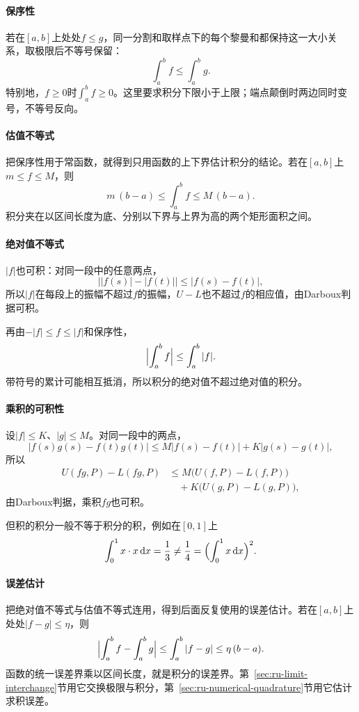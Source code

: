 \paragraph{保序性}
若在$[a,b]$上处处$f\leq g$，同一分割和取样点下的每个黎曼和都保持这一大小关系，取极限后不等号保留：
\[
 \int_a^bf\leq\int_a^bg.
\]
特别地，$f\geq0$时$\int_a^bf\geq0$。这里要求积分下限小于上限；端点颠倒时两边同时变号，不等号反向。

\paragraph{估值不等式}
把保序性用于常函数，就得到只用函数的上下界估计积分的结论。若在$[a,b]$上$m\leq f\leq M$，则
\[
 m\,(b-a)\leq\int_a^bf\leq M\,(b-a).
\]
积分夹在以区间长度为底、分别以下界与上界为高的两个矩形面积之间。

\paragraph{绝对值不等式}
$|f|$也可积：对同一段中的任意两点，
\[
 \bigl||f(s)|-|f(t)|\bigr|\leq|f(s)-f(t)|,
\]
所以$|f|$在每段上的振幅不超过$f$的振幅，$U-L$也不超过$f$的相应值，由Darboux判据可积。

再由$-|f|\leq f\leq|f|$和保序性，
\[
 \Bigl|\int_a^bf\Bigr|\leq\int_a^b|f|.
\]
带符号的累计可能相互抵消，所以积分的绝对值不超过绝对值的积分。

\paragraph{乘积的可积性}
设$|f|\leq K$、$|g|\leq M$。对同一段中的两点，
\[
 |f(s)g(s)-f(t)g(t)|\leq M|f(s)-f(t)|+K|g(s)-g(t)|,
\]
所以
\[
 \begin{aligned}
 U(fg,P)-L(fg,P)&\leq M\bigl(U(f,P)-L(f,P)\bigr)\\
 &\quad+K\bigl(U(g,P)-L(g,P)\bigr),
 \end{aligned}
\]
由Darboux判据，乘积$fg$也可积。

但积的积分一般不等于积分的积，例如在$[0,1]$上
\[
 \int_0^1x\cdot x\,\mathrm dx=\frac13\neq\frac14=\Bigl(\int_0^1x\,\mathrm dx\Bigr)^2.
\]

\paragraph{误差估计}
把绝对值不等式与估值不等式连用，得到后面反复使用的误差估计。若在$[a,b]$上处处$|f-g|\leq\eta$，则
\begin{equation}
 \Bigl|\int_a^bf-\int_a^bg\Bigr|\leq\int_a^b|f-g|\leq\eta\,(b-a).
 \label{eq:ru-integral-error-estimate}
\end{equation}
函数的统一误差界乘以区间长度，就是积分的误差界。第~\ref{sec:ru-limit-interchange}节用它交换极限与积分，第~\ref{sec:ru-numerical-quadrature}节用它估计求积误差。

